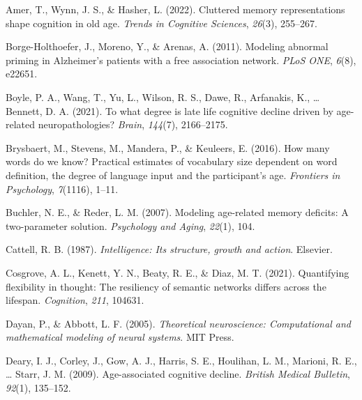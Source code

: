 \documentclass[
  man]{apa6}
\newlength{\cslhangindent}
\newlength{\cslentryspacingunit} %
\newenvironment{CSLReferences}[2] %
 {%
  \setlength{\parindent}{0pt}
  \ifodd #1
  \let\oldpar\par
  \def\par{\hangindent=\cslhangindent\oldpar}
  \fi
  \setlength{\parskip}{#2\cslentryspacingunit}
 }%
 {}
\begin{document}
\hypertarget{refs}{}
\begin{CSLReferences}{1}{0}
\leavevmode{}%
Amer, T., Wynn, J. S., \& Hasher, L. (2022). Cluttered memory representations shape cognition in old age. \emph{Trends in Cognitive Sciences}, \emph{26}(3), 255--267.

\leavevmode{}%
Borge-Holthoefer, J., Moreno, Y., \& Arenas, A. (2011). {Modeling abnormal priming in Alzheimer's patients with a free association network}. \emph{PLoS ONE}, \emph{6}(8), e22651.

\leavevmode{}%
Boyle, P. A., Wang, T., Yu, L., Wilson, R. S., Dawe, R., Arfanakis, K., \ldots{} Bennett, D. A. (2021). To what degree is late life cognitive decline driven by age-related neuropathologies? \emph{Brain}, \emph{144}(7), 2166--2175.

\leavevmode{}%
Brysbaert, M., Stevens, M., Mandera, P., \& Keuleers, E. (2016). How many words do we know? Practical estimates of vocabulary size dependent on word definition, the degree of language input and the participant's age. \emph{Frontiers in Psychology}, \emph{7}(1116), 1--11.

\leavevmode{}%
Buchler, N. E., \& Reder, L. M. (2007). Modeling age-related memory deficits: A two-parameter solution. \emph{Psychology and Aging}, \emph{22}(1), 104.

\leavevmode{}%
Cattell, R. B. (1987). \emph{Intelligence: Its structure, growth and action}. Elsevier.

\leavevmode{}%
Cosgrove, A. L., Kenett, Y. N., Beaty, R. E., \& Diaz, M. T. (2021). Quantifying flexibility in thought: The resiliency of semantic networks differs across the lifespan. \emph{Cognition}, \emph{211}, 104631.

\leavevmode{}%
Dayan, P., \& Abbott, L. F. (2005). \emph{Theoretical neuroscience: Computational and mathematical modeling of neural systems}. MIT Press.

\leavevmode{}%
Deary, I. J., Corley, J., Gow, A. J., Harris, S. E., Houlihan, L. M., Marioni, R. E., \ldots{} Starr, J. M. (2009). Age-associated cognitive decline. \emph{British Medical Bulletin}, \emph{92}(1), 135--152.


\end{CSLReferences}
\end{document}
